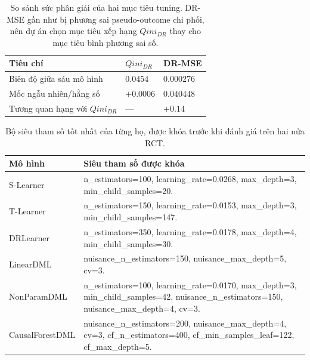 \documentclass[11pt,a4paper]{article}
\DeclareRobustCommand{\code}[1]{{\small\texttt{#1}}}
\def\code#1{#1}%
\begin{document}
\begin{table}[H]
\centering
\small
\begin{tabularx}{0.9\textwidth}{X
    >{\centering\arraybackslash}p{2.8cm}
    >{\centering\arraybackslash}p{2.8cm}}
\toprule
\textbf{Tiêu chí} & \textbf{$Qini_{DR}$} & \textbf{DR-MSE} \\
\midrule
Biên độ giữa sáu mô hình & $0.0454$ & $0.000276$ \\
Mốc ngẫu nhiên/hằng số & $+0.0006$ & $0.040448$ \\
Tương quan hạng với $Qini_{DR}$ & --- & $+0.14$ \\
\bottomrule
\end{tabularx}
\caption{So sánh sức phân giải của hai mục tiêu tuning. DR-MSE gần như bị
phương sai pseudo-outcome chi phối, nên dự án chọn mục tiêu xếp hạng
$Qini_{DR}$ thay cho mục tiêu bình phương sai số.}
\label{tab:qini-vs-drmse}
\end{table}

\begin{table}[H]
\centering
\scriptsize
\begin{tabularx}{\textwidth}{>{\raggedright\arraybackslash}p{2.6cm}X}
\toprule
\textbf{Mô hình} & \textbf{Siêu tham số được khóa} \\
\midrule
S-Learner & \code{n\_estimators=100}, \code{learning\_rate=0.0268}, \code{max\_depth=3}, \code{min\_child\_samples=20}. \\
T-Learner & \code{n\_estimators=150}, \code{learning\_rate=0.0153}, \code{max\_depth=3}, \code{min\_child\_samples=147}. \\
DRLearner & \code{n\_estimators=350}, \code{learning\_rate=0.0178}, \code{max\_depth=4}, \code{min\_child\_samples=30}. \\
LinearDML & \code{nuisance\_n\_estimators=150}, \code{nuisance\_max\_depth=5}, \code{cv=3}. \\
NonParamDML & \code{n\_estimators=100}, \code{learning\_rate=0.0170}, \code{max\_depth=3}, \code{min\_child\_samples=42}, \code{nuisance\_n\_estimators=150}, \code{nuisance\_max\_depth=4}, \code{cv=3}. \\
CausalForestDML & \code{nuisance\_n\_estimators=200}, \code{nuisance\_max\_depth=4}, \code{cv=3}, \code{cf\_n\_estimators=400}, \code{cf\_min\_samples\_leaf=122}, \code{cf\_max\_depth=5}. \\
\bottomrule
\end{tabularx}
\caption{Bộ siêu tham số tốt nhất của từng họ, được khóa trước khi đánh giá
trên hai nửa RCT.}
\label{tab:best-hyperparameters}
\end{table}
\end{document}
